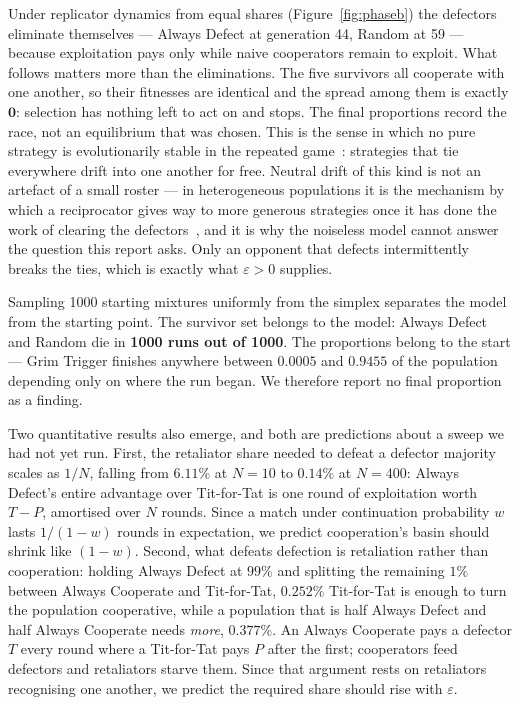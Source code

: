 \documentclass[11pt,a4paper]{article}
\newcommand{\eps}{\varepsilon}
\begin{document}
Under replicator dynamics from equal shares (Figure~\ref{fig:phaseb}) the
defectors eliminate themselves --- Always Defect at generation 44, Random at 59
--- because exploitation pays only while naive cooperators remain to exploit.
What follows matters more than the eliminations. The five survivors all
cooperate with one another, so their fitnesses are identical and the spread among
them is exactly $\mathbf{0}$: selection has nothing left to act on and stops.
The final proportions record the race, not an equilibrium that was chosen. This is
the sense in which no pure strategy is evolutionarily stable in the repeated
game~\cite{boyd1987}: strategies that tie everywhere drift into one another for
free. Neutral drift of this kind is not an artefact of a small roster --- in
heterogeneous populations it is the mechanism by which a reciprocator gives way
to more generous strategies once it has done the work of clearing the
defectors~\cite{nowak1992}, and it is why the noiseless model cannot answer the
question this report asks. Only an opponent that defects intermittently breaks
the ties, which is exactly what $\eps > 0$ supplies.

Sampling 1000 starting mixtures uniformly from the simplex separates the model
from the starting point. The survivor set belongs to the model: Always Defect and
Random die in \textbf{1000 runs out of 1000}. The proportions belong to the
start --- Grim Trigger finishes anywhere between $0.0005$ and $0.9455$ of the
population depending only on where the run began. We therefore report no final
proportion as a finding.

Two quantitative results also emerge, and both are predictions about a sweep we
had not yet run. First, the retaliator share needed to defeat a
defector majority scales as $1/N$, falling from $6.11\%$ at $N=10$ to $0.14\%$
at $N=400$: Always Defect's entire advantage over Tit-for-Tat is one round of
exploitation worth $T-P$, amortised over $N$ rounds. Since a match under
continuation probability $w$ lasts $1/(1-w)$ rounds in expectation, we predict
cooperation's basin should shrink like $(1-w)$. Second, what defeats defection is
retaliation rather than cooperation: holding Always Defect at $99\%$ and
splitting the remaining $1\%$ between Always Cooperate and Tit-for-Tat,
$\mathbf{0.252\%}$ Tit-for-Tat is enough to turn the population cooperative,
while a population that is half Always Defect and half Always Cooperate needs
\emph{more}, $\mathbf{0.377\%}$. An Always Cooperate pays a defector $T$ every round where a Tit-for-Tat pays $P$
after the first; cooperators feed defectors and retaliators starve them. Since
that argument rests on retaliators recognising one another, we predict the
required share should rise with $\eps$.
\end{document}
